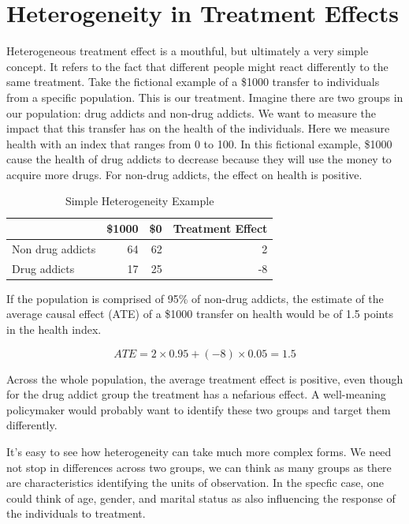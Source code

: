 \section{Heterogeneity in Treatment Effects}

Heterogeneous treatment effect is a mouthful, but ultimately a very simple concept. It refers to the fact that different people might react differently to the same treatment. Take the fictional example of a \$1000 transfer to individuals from a specific population. This is our treatment. Imagine there are two groups in our population: drug addicts and non-drug addicts. We want to measure the impact that this transfer has on the health of the individuals. Here we measure health with an index that ranges from 0 to 100. In this fictional example, \$1000 cause the health of drug addicts to decrease because they will use the money to acquire more drugs. For non-drug addicts, the effect on health is positive. 

\begin{table}[h!]
  \begin{center}
    \caption{Simple Heterogeneity Example}
    \label{tab:heterogeneity}
    \begin{tabular}{l|r|r|r}
         & \textbf{\$1000} & \textbf{\$0} & \textbf{Treatment Effect}\\
      \hline
        Non drug addicts & 64 & 62 & 2\\
        Drug addicts     & 17 & 25 & -8\\
    \end{tabular}
  \end{center}
\end{table}

If the population is comprised of 95\% of non-drug addicts, the estimate of the average causal effect (ATE) of a \$1000 transfer on health would be of 1.5 points in the health index.

\begin{equation}
    ATE = 2 \times 0.95 + (-8) \times 0.05 = 1.5
\end{equation}

Across the whole population, the average treatment effect is positive, even though for the drug addict group the treatment has a nefarious effect. A well-meaning policymaker would probably want to identify these two groups and target them differently.


It's easy to see how heterogeneity can take much more complex forms. We need not stop in differences across two groups, we can think as many groups as there are characteristics identifying the units of observation. In the specfic case, one could think of age, gender, and marital status as also influencing the response of the individuals to treatment.

